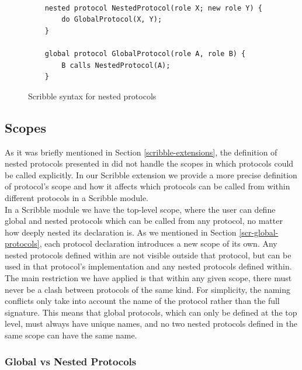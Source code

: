 \documentclass[12pt,twoside]{report}
\begin{document}
\begin{figure}[h]
    \centering
    \lstset{language=Scribble}
    \begin{lstlisting}
    
    nested protocol NestedProtocol(role X; new role Y) {
        do GlobalProtocol(X, Y);
    }
    
    global protocol GlobalProtocol(role A, role B) {
        B calls NestedProtocol(A);
    }
        \end{lstlisting}
        \caption{Scribble syntax for nested protocols}
        \label{scribble-nested-global}
    \end{figure}{}
 
\subsection{Scopes}

As it was briefly mentioned in Section \ref{scribble-extensions}, the definition of nested protocols presented in \cite{nestedprotocols} did not handle the scopes in which protocols could be called explicitly. In our Scribble extension we provide a more precise definition of protocol's scope and how it affects which protocols can be called from within different protocols in a Scribble module.\\

In a Scribble module we have the top-level scope, where the user can define global and nested protocols which can be called from any protocol, no matter how deeply nested its declaration is. As we mentioned in Section \ref{scr-global-protocols}, each protocol declaration introduces a new scope of its own.  Any nested protocols defined within are not visible outside that  protocol, but can be used in that protocol's implementation and any nested protocols defined within.\\

The main restriction we have applied is that within any given scope, there must never be a clash between protocols of the same kind. For simplicity, the naming conflicts only take into account the name of the protocol rather than the full signature. This means that global protocols, which can only be defined at the top level, must always have unique names, and no two nested protocols defined in the same scope can have the same name.

\subsubsection{Global vs Nested Protocols}
\end{document}
